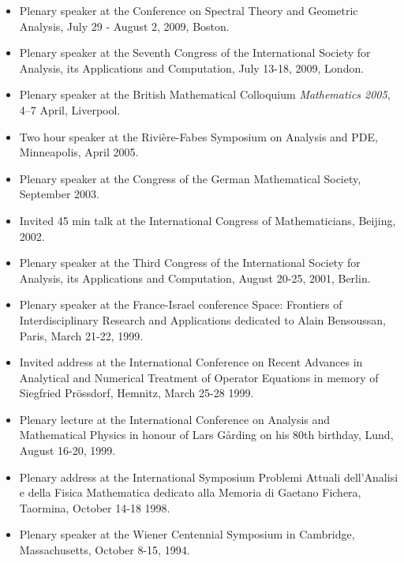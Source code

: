 \documentclass{article}
\begin{document}
\begin{itemize}
\item Plenary speaker at the Conference on Spectral Theory and Geometric Analysis, July 29 - August 2, 2009, Boston.
\item Plenary speaker at the Seventh Congress of the International Society for Analysis, its Applications and Computation, July 13-18, 2009, London.
\item Plenary speaker at the British Mathematical Colloquium {\it Mathematics 2005}, 4--7 April, Liverpool.
\item Two hour speaker at the Rivi\`ere-Fabes Symposium on Analysis and PDE, Minneapolis, April 2005.
\item Plenary speaker at the Congress of the German Mathematical Society, September 2003.
       \item Invited 45 min talk at the
              {International Congress of Mathematicians}, Beijing, 2002.
\item Plenary speaker at the Third Congress of the International Society for Analysis, its Applications and Computation, August 20-25, 2001, Berlin.
 \item Plenary
speaker at the France-Israel
  conference
       {Space: Frontiers of Interdisciplinary Research and Applications}
 dedicated to Alain Bensoussan, Paris, March 21-22, 1999.
       \item Invited address
at the
  {International Conference on Recent Advances in Analytical and Numerical Treatment
  of Operator Equations in memory of Siegfried Pr{\"o}ssdorf}, Hemnitz, March 25-28 1999.

       \item  Plenary
lecture at the
     {International Conference on Analysis and Mathematical
Physics in honour of Lars G{\aa}rding on his 80th birthday}, Lund, August 16-20, 1999.
\item  Plenary
address at the International
  Symposium Problemi Attuali dell'Analisi e
della Fisica Mathematica
  dedicato alla Memoria di Gaetano Fichera, Taormina, October 14-18 1998.
       \item Plenary speaker
 at the Wiener
  Centennial Symposium in Cambridge,
Massachusetts, October 8-15, 1994.
\end{itemize}

\end{document}
